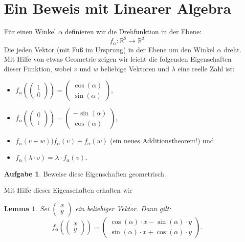 \documentclass[a4paper,ngerman,12pt]{scrartcl}
\newcommand{\IR}{\mathbb{R}}
\theoremstyle{definition}
\newtheorem{aufg}{Aufgabe}
\theoremstyle{plain}
\newtheorem{lemma}[defn]{Lemma}
\theoremstyle{remark}
\begin{document}
\section{Ein Beweis mit Linearer Algebra}

Für einen Winkel $\alpha$ definieren wir die Drehfunktion in der Ebene:
	\[f_\alpha: \IR^2 \to \IR^2\]
Die jeden Vektor (mit Fuß im Ursprung) in der Ebene um den Winkel $\alpha$ dreht. Mit Hilfe von etwas Geometrie zeigen wir leicht die folgenden Eigenschaften dieser Funktion, wobei $v$ und $w$ beliebige Vektoren und $\lambda$ eine reelle Zahl ist:
\begin{itemize}
	\item $f_\alpha\left(\begin{pmatrix}1 \\ 0\end{pmatrix}\right) = \begin{pmatrix}\cos(\alpha) \\ \sin(\alpha)\end{pmatrix}$,
	\item $f_\alpha\left(\begin{pmatrix}0 \\ 1\end{pmatrix}\right) = \begin{pmatrix}-\sin(\alpha) \\ \cos(\alpha)\end{pmatrix}$,
	\item $f_\alpha(v+w) ) f_\alpha(v) + f_\alpha(w)$ (ein neues Additionstheorem!) und
	\item $f_\alpha(\lambda\cdot v) = \lambda\cdot f_\alpha(v)$.
\end{itemize}

\begin{aufg}
	Beweise diese Eigenschaften geometrisch.
\end{aufg}

Mit Hilfe dieser Eigenschaften erhalten wir

\begin{lemma}\label{lemma:RotationsAbbildung}
	Sei $\begin{pmatrix}x \\ y\end{pmatrix}$ ein beliebiger Vektor. Dann gilt:
		\[f_\alpha\left(\begin{pmatrix}x \\ y\end{pmatrix}\right) = \begin{pmatrix}\cos(\alpha) \cdot x - \sin(\alpha)\cdot y \\ \sin(\alpha)\cdot x + \cos(\alpha)\cdot y\end{pmatrix}.\]
\end{lemma}
\end{document}
